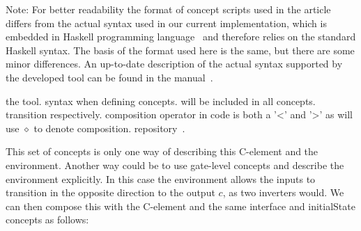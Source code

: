 \documentclass[british, journal]{IEEEtran}
\begin{document}

Note: For better readability the format of concept scripts used in the article
differs from the actual syntax used in our current implementation, which is
embedded in Haskell programming language~\cite{1996_hudak_dsl} and therefore
relies on the standard Haskell syntax. The basis of the format used here is the
same, but there are some minor differences. An up-to-date description of the
actual syntax supported by the developed tool can be found in the
manual~\cite{2016_concepts_github}.

the tool.
syntax when defining concepts.
will be included in all concepts.
transition respectively.
composition operator in code is both a '<' and '>' as
will use $\diamond$ to denote composition.
repository~\cite{2016_concepts_github}.

This set of concepts is only one way of describing this C-element
and the environment. Another way could be to use gate-level concepts
and describe the environment explicitly. In this case the environment
allows the inputs to transition in the opposite direction to the output
$c$, as two inverters would. We can then compose this with the C-element
and the same \textsf{interface} and \textsf{initialState} concepts as follows:
\end{document}
